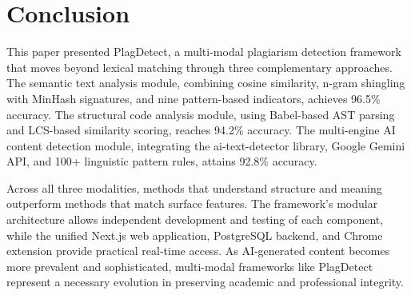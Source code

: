 \documentclass[10pt,twocolumn]{article}
\begin{document}
\section{Conclusion}

This paper presented PlagDetect, a multi-modal plagiarism detection framework that moves beyond lexical matching through three complementary approaches. The semantic text analysis module, combining cosine similarity, n-gram shingling with MinHash signatures, and nine pattern-based indicators, achieves 96.5\% accuracy. The structural code analysis module, using Babel-based AST parsing and LCS-based similarity scoring, reaches 94.2\% accuracy. The multi-engine AI content detection module, integrating the ai-text-detector library, Google Gemini API, and 100+ linguistic pattern rules, attains 92.8\% accuracy.

Across all three modalities, methods that understand structure and meaning outperform methods that match surface features. The framework's modular architecture allows independent development and testing of each component, while the unified Next.js web application, PostgreSQL backend, and Chrome extension provide practical real-time access. As AI-generated content becomes more prevalent and sophisticated, multi-modal frameworks like PlagDetect represent a necessary evolution in preserving academic and professional integrity.
\end{document}
